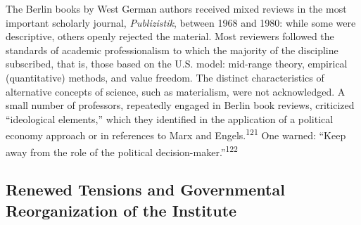 \documentclass{tufte-handout}
\begin{document}
The Berlin books by West German authors received mixed reviews in the
most important scholarly journal, \emph{Publizistik}, between 1968 and
1980: while some were descriptive, others openly rejected the material.
Most reviewers followed the standards of academic professionalism to
which the majority of the discipline subscribed, that is, those based on
the U.S. model: mid-range theory, empirical (quantitative) methods, and
value freedom. The distinct characteristics of alternative concepts of
science, such as materialism, were not acknowledged. A small number of
professors, repeatedly engaged in Berlin book reviews, criticized
``ideological elements,'' which they identified in the application of a
political economy approach or in references to Marx and
Engels.\textsuperscript{121} One warned: ``Keep away from the role of the
political decision-maker.''\textsuperscript{122}

\hypertarget{renewed-tensions-and-governmental-reorganization-of-the-institute}{%
\subsection{Renewed Tensions and Governmental
Reorganization of the
Institute}\label{renewed-tensions-and-governmental-reorganization-of-the-institute}}
\end{document}
